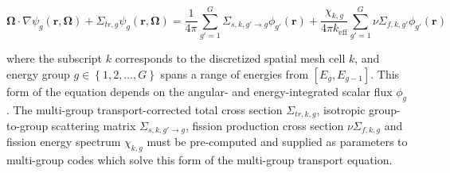 \begin{equation}
\label{eqn:transport-mg}
\mathbf{\Omega} \cdot \nabla \psi_{g}(\mathbf{r},\mathbf{\Omega}) + \Sigma_{tr,g}\psi_{g}(\mathbf{r},\mathbf{\Omega}) = \frac{1}{4\pi} \sum_{g'=1}^{G} \Sigma_{s,k,g' \rightarrow g}\phi_{g'}(\mathbf{r}) + \frac{\chi_{k,g}}{4\pi k_{\textrm{eff}}}\sum_{g'=1}^{G} \nu\Sigma_{f,k,g'}\phi_{g'}(\mathbf{r})
\end{equation}

\noindent where the subscript $k$ corresponds to the discretized spatial mesh cell $k$, and energy group $g \in \left\{1, 2, \ldots, G\right\}$ spans a range of energies from $\left[E_{g}, E_{g-1}\right]$. This form of the equation depends on the angular- and energy-integrated scalar flux $\phi_g$. The multi-group transport-corrected total cross section $\Sigma_{tr,k,g}$, isotropic group-to-group scattering matrix $\Sigma_{s,k,g'\rightarrow g}$, fission production cross section $\nu\Sigma_{f,k,g}$ and fission energy spectrum $\chi_{k,g}$ must be pre-computed and supplied as parameters to multi-group codes which solve this form of the multi-group transport equation.
